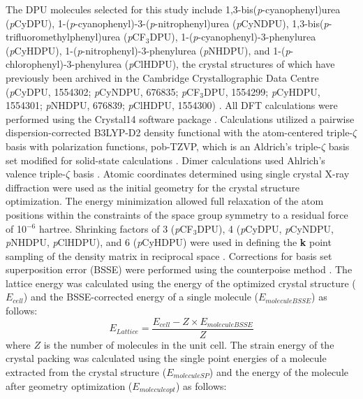The DPU molecules selected for this study include 1,3-bis(\textit{p}-cyanophenyl)urea (\textit{p}CyDPU), 1-(\textit{p}-cyanophenyl)-3-(\textit{p}-nitrophenyl)urea (\textit{p}CyNDPU), 1,3-bis(\textit{p}-trifluoromethylphenyl)urea (\textit{p}CF$_{3}$DPU), 1-(\textit{p}-cyanophenyl)-3-phenylurea (\textit{p}CyHDPU), 1-(\textit{p}-nitrophenyl)-3-phenylurea (\textit{p}NHDPU), and 1-(\textit{p}-chlorophenyl)-3-phenylurea (\textit{p}ClHDPU), the crystal structures of which have previously been archived in the Cambridge Crystallographic Data Centre (\textit{p}CyDPU, 1554302; \textit{p}CyNDPU, 676835; \textit{p}CF$_{3}$DPU, 1554299; \textit{p}CyHDPU, 1554301; \textit{p}NHDPU, 676839; \textit{p}ClHDPU, 1554300) \citep{Groom2016a, Solomos2017a}. All DFT calculations were performed using the Crystal14 software package \citep{Dovesi2014b, Dovesi2016}. Calculations utilized a pairwise dispersion-corrected B3LYP-D2 density functional with the atom-centered triple-$\zeta$ basis with polarization functions, pob-TZVP, which is an Aldrich's triple-$\zeta$ basis set modified for solid-state calculations \citep{Becke1993c, Grimme2004a, Lee1988, Peintinger2013}. Dimer calculations used Ahlrich's valence triple-$\zeta$ basis \citep{Schafer1994, Schuchardt2007}. Atomic coordinates determined using single crystal X-ray diffraction were used as the initial geometry for the crystal structure optimization. The energy minimization allowed full relaxation of the atom positions within the constraints of the space group symmetry to a residual force of 10$^{-6}$ hartree. Shrinking factors of 3 (\textit{p}CF$_{3}$DPU), 4 (\textit{p}CyDPU, \textit{p}CyNDPU, \textit{p}NHDPU, \textit{p}ClHDPU), and 6 (\textit{p}CyHDPU) were used in defining the \textbf{k} point sampling of the density matrix in reciprocal space \citep{Gilat1972, Monkhorst1976a}. Corrections for basis set superposition error (BSSE) were performed using the counterpoise method \cite{Boys1970}. The lattice energy was calculated using the energy of the optimized crystal structure ($E_{cell}$) and the BSSE-corrected energy of a single molecule ($E_{moleculeBSSE}$) as follows:
\begin{equation}\label{elattice}
    E_{Lattice}=\frac{E_{cell}-Z \times E_{moleculeBSSE}}{Z}
\end{equation}
where $Z$ is the number of molecules in the unit cell. The strain energy of the crystal packing was calculated using the single point energies of a molecule extracted from the crystal structure ($E_{moleculeSP}$) and the energy of the molecule after geometry optimization ($E_{moleculeopt}$) as follows:
